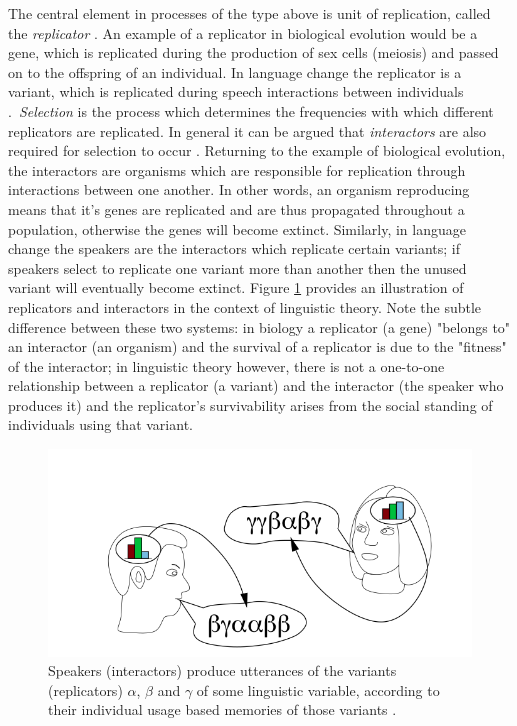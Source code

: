 \documentclass[12pt]{article}
\begin{document}
The central element in processes of the type above is unit of replication, called the \emph{replicator} \cite{hull}. An example of a replicator in biological evolution would be a gene, which is replicated during the production of sex cells (meiosis) and passed on to the offspring of an individual. In language change the replicator is a variant, which is replicated during speech interactions between individuals \cite{lc&v}.\ \emph{Selection} is the process which determines the frequencies with which different replicators are replicated. In general it can be argued that \emph{interactors} are also required for selection to occur \cite{hull}. Returning to the example of biological evolution, the interactors are organisms which are responsible for replication through interactions between one another. In other words, an organism reproducing means that it's genes are replicated and are thus propagated throughout a population, otherwise the genes will become extinct. Similarly, in language change the speakers are the interactors which replicate certain variants; if speakers select to replicate one variant more than another then the unused variant will eventually become extinct. Figure \ref{repInt} provides an illustration of replicators and interactors in the context of linguistic theory. Note the subtle difference between these two systems: in biology a replicator (a gene) "belongs to" an interactor (an organism) and the survival of a replicator is due to the "fitness" of the interactor; in linguistic theory however, there is not a one-to-one relationship between a replicator (a variant) and the interactor (the speaker who produces it) and the replicator's survivability arises from the social standing of individuals using that variant.

\begin{figure}[h]
\begin{center}
\includegraphics[width=\textwidth*8/10]{replicatorsInteractors.png}
\end{center}
\caption{Speakers (interactors) produce utterances of the variants (replicators) $\alpha$, $\beta$ and $\gamma$ of some linguistic variable, according to their individual usage based memories of those variants \cite{USM}.}\label{repInt}
\end{figure}
\end{document}
